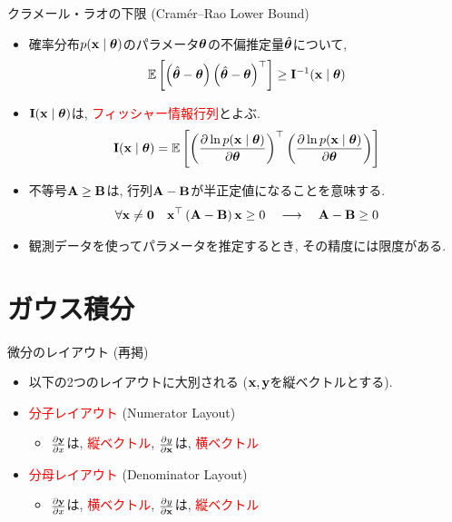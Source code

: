 \documentclass[dvipdfmx,notheorems,t]{beamer}
\begin{document}
\begin{frame}{クラメール・ラオの下限 (Cramér--Rao Lower Bound)}
\begin{itemize}
  \item 確率分布$p(\vb{x} \mid \vb*{\theta})$のパラメータ$\vb*{\theta}$の不偏推定量$\hat{\vb*{\theta}}$について,
  \begin{align*}
    \operatorname{\mathbb{E}} \left[ \left( \hat{\vb*{\theta}} - \vb*{\theta} \right)
      \left( \hat{\vb*{\theta}} - \vb*{\theta} \right)^\top \right] \ge \vb{I}^{-1}(\vb{x} \mid \vb*{\theta})
  \end{align*}
  \item $\vb{I}(\vb{x} \mid \vb*{\theta})$は, \textcolor{red}{フィッシャー情報行列}とよぶ.
  \begin{align*}
    \vb{I}(\vb{x} \mid \vb*{\theta}) = \operatorname{\mathbb{E}} \left[ 
      \left( \pdv{\ln p(\vb{x} \mid \vb*{\theta})}{\vb*{\theta}} \right)^\top
      \left( \pdv{\ln p(\vb{x} \mid \vb*{\theta})}{\vb*{\theta}} \right) \right]
  \end{align*}
  \item 不等号$\vb{A} \ge \vb{B}$は, 行列$\vb{A} - \vb{B}$が半正定値になることを意味する.
  \begin{align*}
    \forall \vb{x} \neq \vb{0} \quad \vb{x}^\top \left( \vb{A} - \vb{B} \right) \vb{x} \ge 0
    \quad \longrightarrow \quad \vb{A} - \vb{B} \ge 0
  \end{align*}
  \item 観測データを使ってパラメータを推定するとき, その精度には限度がある.
\end{itemize}
\end{frame}

\section{ガウス積分}

\begin{frame}{微分のレイアウト (再掲)}
\begin{itemize}
  \item 以下の2つのレイアウトに大別される ($\vb{x}, \vb{y}$を縦ベクトルとする).
  \item \textcolor{red}{分子レイアウト} (Numerator Layout)
  \begin{itemize}
    \item $\pdv{\vb{y}}{x}$は, \textcolor{red}{縦ベクトル},
    $\pdv{y}{\vb{x}}$は, \textcolor{red}{横ベクトル}
  \end{itemize}
  \item \textcolor{red}{分母レイアウト} (Denominator Layout)
  \begin{itemize}
    \item $\pdv{\vb{y}}{x}$は, \textcolor{red}{横ベクトル},
    $\pdv{y}{\vb{x}}$は, \textcolor{red}{縦ベクトル}
  \end{itemize}
\end{itemize}
\end{frame}
\end{document}
